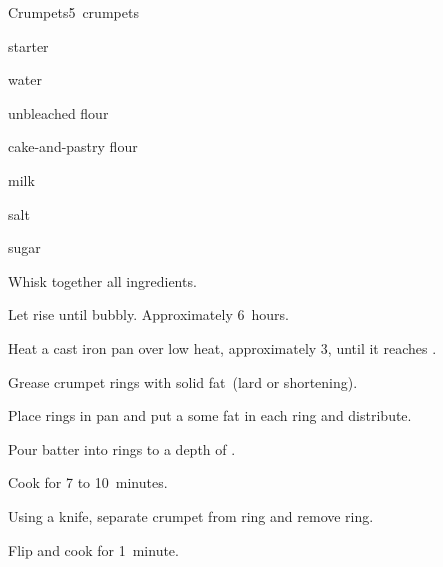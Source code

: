 \begin{recipe}{Crumpets}{}{5~crumpets}

\begin{ingredients}
\item {} starter
\item {} water
\item {} unbleached flour
\item {} cake-and-pastry flour
\item {} milk
\item \tp{\half} salt
\item \tp{1\half} sugar
\end{ingredients}

\begin{directions}
\item Whisk together all ingredients.
\item Let rise until bubbly. Approximately 6~hours.
\item Heat a cast iron pan over low heat, approximately 3, until it reaches .
\item Grease  crumpet rings with solid fat~(lard or shortening).
\item Place rings in pan and put a some fat in each ring and distribute.
\item Pour batter into rings to a depth of .
\item Cook for 7 to 10~minutes.
\item Using a knife, separate crumpet from ring and remove ring.
\item Flip and cook for 1~minute.
\end{directions}

\end{recipe}
